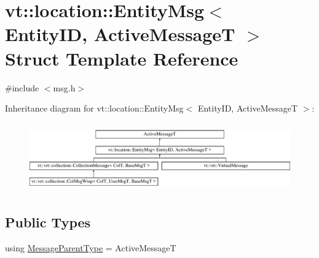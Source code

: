 \hypertarget{structvt_1_1location_1_1_entity_msg}{}\section{vt\+:\+:location\+:\+:Entity\+Msg$<$ Entity\+ID, Active\+MessageT $>$ Struct Template Reference}
\label{structvt_1_1location_1_1_entity_msg}


{\ttfamily \#include $<$msg.\+h$>$}

Inheritance diagram for vt\+:\+:location\+:\+:Entity\+Msg$<$ Entity\+ID, Active\+MessageT $>$\+:\begin{figure}[H]
\begin{center}
\leavevmode
\includegraphics[height=2.994652cm]{structvt_1_1location_1_1_entity_msg}
\end{center}
\end{figure}
\subsection*{Public Types}
\begin{DoxyCompactItemize}
\item 
using \hyperlink{structvt_1_1location_1_1_entity_msg_a186637100a628eb04cb00127f5579210}{Message\+Parent\+Type} = Active\+MessageT
\end{DoxyCompactItemize}

